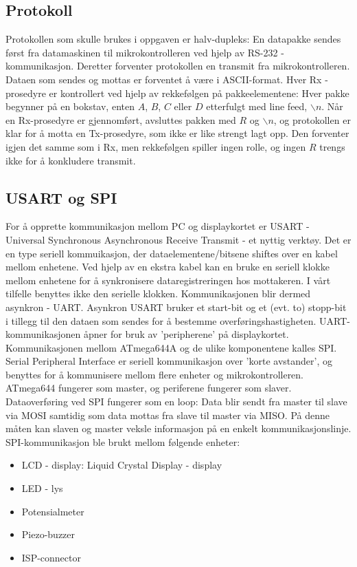 \documentclass[12pt, a4paper]{report}
\begin{document}
\subsection{Protokoll}
Protokollen som skulle brukes i oppgaven er halv-dupleks: En datapakke sendes først fra datamaskinen til mikrokontrolleren ved hjelp av RS-232 - kommunikasjon. Deretter forventer protokollen en transmit fra mikrokontrolleren. Dataen som sendes og mottas er forventet å være i ASCII-format. Hver Rx - prosedyre er kontrollert ved hjelp av rekkefølgen på pakkeelementene: Hver pakke begynner på en bokstav, enten $A$, $B$, $C$ eller $D$ etterfulgt med line feed, $\backslash n$. Når en Rx-prosedyre er gjennomført, avsluttes pakken med $R$ og $\backslash n$, og protokollen er klar for å motta en Tx-prosedyre, som ikke er like strengt lagt opp. Den forventer igjen det samme som i Rx, men rekkefølgen spiller ingen rolle, og ingen $R$ trengs ikke for å konkludere transmit. 

\subsection{USART og SPI}
For å opprette kommunikasjon mellom PC og displaykortet er USART - Universal Synchronous Asynchronous Receive Transmit - et nyttig verktøy. Det er en type seriell kommuikasjon, der dataelementene/bitsene shiftes over en kabel mellom enhetene. Ved hjelp av en ekstra kabel kan en bruke en seriell klokke mellom enhetene for å synkronisere dataregistreringen hos mottakeren. I vårt tilfelle benyttes ikke den serielle klokken. Kommunikasjonen blir dermed asynkron - UART. Asynkron USART bruker et start-bit og et (evt. to) stopp-bit i tillegg til den dataen som sendes for å bestemme overføringshastigheten. UART-kommunikasjonen åpner for bruk av 'peripherene' på displaykortet. Kommunikasjonen mellom ATmega644A og de ulike komponentene kalles SPI. Serial Peripheral Interface er seriell kommunikasjon over 'korte avstander', og benyttes for å kommunisere mellom flere enheter og mikrokontrolleren. ATmega644 fungerer som master, og periferene fungerer som slaver. Dataoverføring ved SPI fungerer som en loop: Data blir sendt fra master til slave via MOSI samtidig som data mottas fra slave til master via MISO. På denne måten kan slaven og master veksle informasjon på en enkelt kommunikasjonslinje. SPI-kommunikasjon ble brukt mellom følgende enheter:

\begin{itemize}
\item LCD - display: Liquid Crystal Display - display
\item LED - lys
\item Potensialmeter
\item Piezo-buzzer
\item ISP-connector 
\end{itemize}
\end{document}
